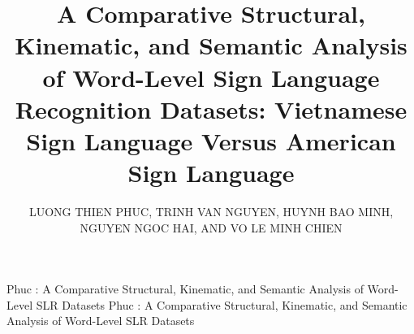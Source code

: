 \documentclass{ieeeaccess}
\begin{document}
\raggedbottom


\title{A Comparative Structural, Kinematic, and Semantic Analysis of Word-Level Sign Language Recognition Datasets: Vietnamese Sign Language Versus American Sign Language}

\author{\uppercase{Luong Thien Phuc}, 
\uppercase{Trinh Van Nguyen}, 
\uppercase{Huynh Bao Minh}, 
\uppercase{Nguyen Ngoc Hai}, AND 
\uppercase{Vo Le Minh Chien}}

\address{HCMC University of Technology and Engineering, Faculty of IT, Ho Chi Minh City 700000, Vietnam}

\markboth
{Phuc \headeretal: A Comparative Structural, Kinematic, and Semantic Analysis of Word-Level SLR Datasets}
{Phuc \headeretal: A Comparative Structural, Kinematic, and Semantic Analysis of Word-Level SLR Datasets}


\end{document}
